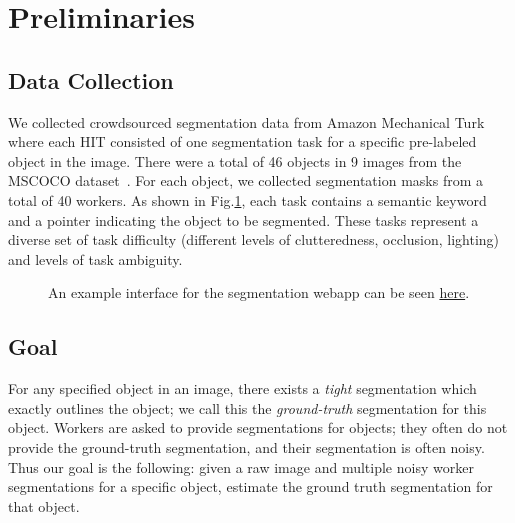 \section{Preliminaries}
\subsection{Data Collection\label{sec:data}}
We collected crowdsourced segmentation data from Amazon Mechanical Turk where each HIT consisted of one segmentation task for a specific pre-labeled object in the image. There were a total of 46 objects in 9 images from the MSCOCO dataset~\cite{Lin2014}. For each object, we collected segmentation masks from a total of 40 workers. As shown in Fig.\ref{interface}, each task contains a semantic keyword and a pointer indicating the object to be segmented. These tasks represent a diverse set of task difficulty (different levels of clutteredness, occlusion, lighting) and levels of task ambiguity. 
\begin{figure}[ht!]
\centering
{}
\caption{An example interface for the segmentation webapp can be seen  \href{http://crowd-segment.herokuapp.com/segment/COCO_train2014_000000000127/10/}{here}.}
\label{interface}
\end{figure}
\subsection{Goal}
For any specified object in an image, there exists a {\em tight} segmentation  which exactly outlines the object; we call this the {\em ground-truth} segmentation for this object.  Workers are asked to provide segmentations for objects; they often do not provide the ground-truth segmentation,
and their segmentation is often noisy. Thus our goal is the following: given a raw image and multiple noisy worker segmentations for a specific object, estimate the ground truth segmentation for that object.  
